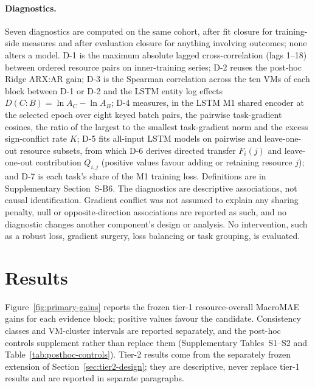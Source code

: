 \documentclass[5p,twocolumn]{elsarticle}
\begin{document}
\paragraph{Diagnostics.} Seven diagnostics are computed on the same cohort,
after fit closure for training-side measures and after evaluation closure for
anything involving outcomes; none alters a model.
D-1 is the maximum absolute lagged cross-correlation (lags 1--18) between
ordered resource pairs on inner-training series; D-2 reuses the post-hoc Ridge
ARX:AR gain; D-3 is the Spearman correlation across the ten VMs of each block
between D-1 or D-2 and the LSTM entity log effects
$D(C\!:\!B)=\ln A_C-\ln A_B$; D-4 measures, in the LSTM M1 shared encoder at
the selected epoch over eight keyed batch pairs, the pairwise task-gradient
cosines, the ratio of the largest to the smallest task-gradient norm and the
excess sign-conflict rate $K$; D-5 fits all-input LSTM models on pairwise and
leave-one-out resource subsets, from which D-6 derives directed transfer
$F_i(j)$ and leave-one-out contribution $Q_{i,j}$ (positive values favour
adding or retaining resource $j$); and D-7 is each task's share of the M1
training loss. Definitions are in Supplementary Section~S-B6.
The diagnostics are descriptive associations, not causal identification.
Gradient conflict was not assumed to explain any sharing penalty, null or
opposite-direction associations are reported as such, and no diagnostic
changes another component's design or analysis. No intervention, such as a
robust loss, gradient surgery, loss balancing or task grouping, is evaluated.

\section{Results}

Figure~\ref{fig:primary-gains} reports the frozen tier-1 resource-overall
MacroMAE gains for each evidence block; positive values favour the candidate.
Consistency classes and VM-cluster intervals are reported separately, and the
post-hoc controls supplement rather than replace them (Supplementary
Tables~S1--S2 and Table~\ref{tab:posthoc-controls}). Tier-2 results come from the
separately frozen extension of Section~\ref{sec:tier2-design}; they are
descriptive, never replace tier-1 results and are reported in separate
paragraphs.
\end{document}
